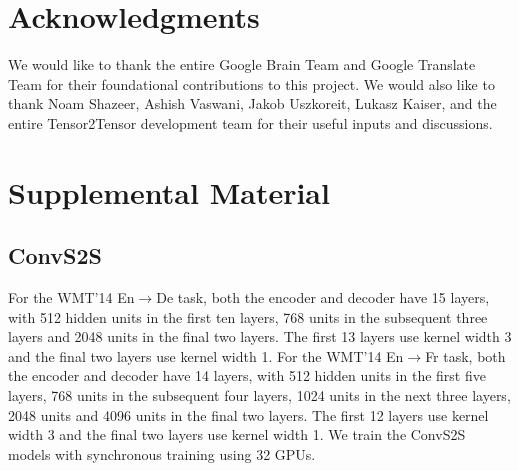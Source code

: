 \documentclass[11pt,a4paper]{article}
\newif\ifblindreview \blindreviewfalse
\begin{document}
%
%
%
%


\ifblindreview
\else
\section*{Acknowledgments}

We would like to thank the entire Google Brain Team and Google Translate Team for their foundational contributions to this project. We would also like to thank Noam Shazeer, Ashish Vaswani, Jakob Uszkoreit, Lukasz Kaiser, and the entire Tensor2Tensor development team for their useful inputs and discussions.
\fi

%
%



\vfill

\pagebreak

\appendix

\section{Supplemental Material}
\label{sec:supplemental}

\subsection{ConvS2S}

For the WMT'14 En$\rightarrow$De task, both the encoder and decoder have 15
layers, with 512 hidden units in the first ten layers, 768 units in the
subsequent three layers and 2048 units in the final two layers.
The first 13 layers use kernel width 3 and the final two layers use kernel
width 1. For the WMT'14 En$\rightarrow$Fr task, both the encoder and decoder
have 14 layers, with 512 hidden units in the first five layers, 768 units
in the subsequent four layers, 1024 units in the next three layers, 2048 units
and 4096 units in the final two layers. The first 12 layers use kernel width 3
and the final two layers use kernel width 1.
We train the ConvS2S models with synchronous training using 32 GPUs.
\end{document}
